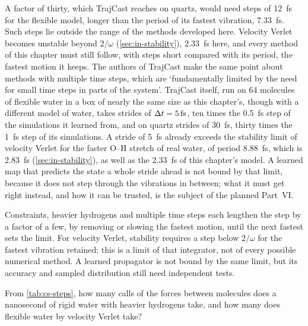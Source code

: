 A factor of thirty, which TrajCast reaches on quartz, would need steps of
\SI{12}{\femto\second} for the flexible model, longer than the period of its fastest vibration,
\SI{7.33}{\femto\second}. Such steps lie outside the range of the methods developed here.
Velocity Verlet becomes unstable beyond $2/\omega$
(\cref{sec:in-stability}), \SI{2.33}{\femto\second} here, and every
method of this chapter must still follow, with steps short compared with
its period, the fastest motion it keeps. The authors of TrajCast make the
same point about methods with multiple time steps, which are
`fundamentally limited by the need for small time steps in parts of the
system'\cite{Thiemann2026}. TrajCast itself, run on 64 molecules of
flexible water in a box of nearly the same size as this chapter's, though
with a different model of water, takes strides of $\Dt =
\SI{5}{\femto\second}$, ten times the \SI{0.5}{\femto\second} step of the
simulations it learned from, and on quartz strides of
\SI{30}{\femto\second}, thirty times the \SI{1}{\femto\second} step of its
simulations\cite{Thiemann2026}. A stride of \SI{5}{\femto\second} already
exceeds the stability limit of velocity Verlet for the faster O--H stretch
of real water, of period \SI{8.88}{\femto\second}, which is
\SI{2.83}{\femto\second} (\cref{sec:in-stability}), as well as the
\SI{2.33}{\femto\second} of this chapter's model. A learned map that predicts
the state a whole stride ahead is not bound by that limit, because it does
not step through the vibrations in between; what it must get right
instead, and how it can be trusted, is the subject of the planned Part~VI.

\begin{keyidea}
Constraints, heavier hydrogens and multiple time steps each lengthen the
step by a factor of a few, by removing or slowing the fastest motion,
until the next fastest sets the limit. For velocity Verlet, stability requires a step below $2/\omega$ for the
fastest vibration retained; this is a limit of that integrator, not of
every possible numerical method. A learned propagator is not bound by
the same limit, but its accuracy and sampled distribution still need
independent tests.
\end{keyidea}

\begin{selfcheck}
From \cref{tab:cs-steps}, how many calls of the forces between molecules
does a nanosecond of rigid water with heavier hydrogens take, and how
many does flexible water by velocity Verlet take?
\end{selfcheck}
